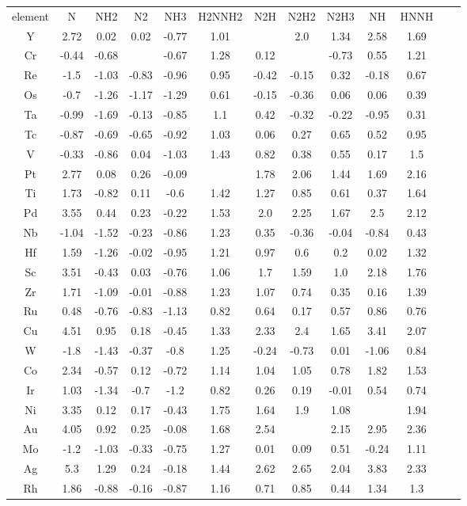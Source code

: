 \begin{center}
\begin{tabular}{| c | c | c | c | c | c | c | c | c | c | c | c | c |}
\hline
element & N & NH2 & N2 & NH3 & H2NNH2 & N2H & N2H2 & N2H3 & NH & HNNH & \hline
\\
Y & 2.72 & 0.02 & 0.02 & -0.77 & 1.01 &  & 2.0 & 1.34 & 2.58 & 1.69 \\
Cr & -0.44 & -0.68 &  & -0.67 & 1.28 & 0.12 &  & -0.73 & 0.55 & 1.21 \\
Re & -1.5 & -1.03 & -0.83 & -0.96 & 0.95 & -0.42 & -0.15 & 0.32 & -0.18 & 0.67 \\
Os & -0.7 & -1.26 & -1.17 & -1.29 & 0.61 & -0.15 & -0.36 & 0.06 & 0.06 & 0.39 \\
Ta & -0.99 & -1.69 & -0.13 & -0.85 & 1.1 & 0.42 & -0.32 & -0.22 & -0.95 & 0.31 \\
Tc & -0.87 & -0.69 & -0.65 & -0.92 & 1.03 & 0.06 & 0.27 & 0.65 & 0.52 & 0.95 \\
V & -0.33 & -0.86 & 0.04 & -1.03 & 1.43 & 0.82 & 0.38 & 0.55 & 0.17 & 1.5 \\
Pt & 2.77 & 0.08 & 0.26 & -0.09 &  & 1.78 & 2.06 & 1.44 & 1.69 & 2.16 \\
Ti & 1.73 & -0.82 & 0.11 & -0.6 & 1.42 & 1.27 & 0.85 & 0.61 & 0.37 & 1.64 \\
Pd & 3.55 & 0.44 & 0.23 & -0.22 & 1.53 & 2.0 & 2.25 & 1.67 & 2.5 & 2.12 \\
Nb & -1.04 & -1.52 & -0.23 & -0.86 & 1.23 & 0.35 & -0.36 & -0.04 & -0.84 & 0.43 \\
Hf & 1.59 & -1.26 & -0.02 & -0.95 & 1.21 & 0.97 & 0.6 & 0.2 & 0.02 & 1.32 \\
Sc & 3.51 & -0.43 & 0.03 & -0.76 & 1.06 & 1.7 & 1.59 & 1.0 & 2.18 & 1.76 \\
Zr & 1.71 & -1.09 & -0.01 & -0.88 & 1.23 & 1.07 & 0.74 & 0.35 & 0.16 & 1.39 \\
Ru & 0.48 & -0.76 & -0.83 & -1.13 & 0.82 & 0.64 & 0.17 & 0.57 & 0.86 & 0.76 \\
Cu & 4.51 & 0.95 & 0.18 & -0.45 & 1.33 & 2.33 & 2.4 & 1.65 & 3.41 & 2.07 \\
W & -1.8 & -1.43 & -0.37 & -0.8 & 1.25 & -0.24 & -0.73 & 0.01 & -1.06 & 0.84 \\
Co & 2.34 & -0.57 & 0.12 & -0.72 & 1.14 & 1.04 & 1.05 & 0.78 & 1.82 & 1.53 \\
Ir & 1.03 & -1.34 & -0.7 & -1.2 & 0.82 & 0.26 & 0.19 & -0.01 & 0.54 & 0.74 \\
Ni & 3.35 & 0.12 & 0.17 & -0.43 & 1.75 & 1.64 & 1.9 & 1.08 &  & 1.94 \\
Au & 4.05 & 0.92 & 0.25 & -0.08 & 1.68 & 2.54 &  & 2.15 & 2.95 & 2.36 \\
Mo & -1.2 & -1.03 & -0.33 & -0.75 & 1.27 & 0.01 & 0.09 & 0.51 & -0.24 & 1.11 \\
Ag & 5.3 & 1.29 & 0.24 & -0.18 & 1.44 & 2.62 & 2.65 & 2.04 & 3.83 & 2.33 \\
Rh & 1.86 & -0.88 & -0.16 & -0.87 & 1.16 & 0.71 & 0.85 & 0.44 & 1.34 & 1.3 \\
\hline
\end{tabular}
\end{center}